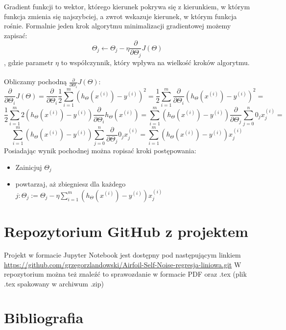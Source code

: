 \documentclass{article}
\begin{document}
Gradient funkcji to wektor, którego kierunek pokrywa się z kierunkiem, w którym funkcja zmienia się najszybciej, a zwrot wskazuje kierunek, w którym funkcja rośnie. Formalnie jeden krok algorytmu minimalizacji gradientowej możemy zapisać:
\[\Theta_j \leftarrow\Theta_j - \eta\frac{\partial}{\partial\Theta_j}J(\Theta)\]
, gdzie parametr $\eta$ to współczynnik, który wpływa na wielkość kroków algorytmu.
\\
\\
Obliczamy pochodną $\frac{\partial}{\partial\Theta_i}J(\Theta)$:
\[\frac{\partial}{\partial\Theta_i}J(\Theta) = \frac{\partial}{\partial\Theta_i}\frac{1}{2}\sum_{i=1}^m{(h_\Theta(x^{(i)}) - y^{(i)})}^2 =
\frac{1}{2}\sum_{i=1}^m\frac{\partial}{\partial\Theta_i} {(h_\Theta(x^{(i)}) - y^{(i)})}^2 =
\]
\[
\frac{1}{2}\sum_{i=1}^m2(h_\Theta(x^{(i)}) - y^{(i)})\frac{\partial}{\partial\Theta_i}h_\Theta(x^{(i)}) =
\sum_{i=1}^m(h_\Theta(x^{(i)}) - y^{(i)})\frac{\partial}{\partial\Theta_j}\sum_{j=0}^n 0_j x_j^{(i)} =
\]
\[
\sum_{i=1}^m(h_\Theta(x^{(i)}) - y^{(i)})\sum_{j=0}^n\frac{\partial}{\partial\Theta_j} 0_j x_j^{(i)} =
\sum_{i=1}^m(h_\Theta(x^{(i)}) - y^{(i)})x^{(i)}_j
\]
\newpage
Posiadając wynik pochodnej można ropisać kroki postępowania:
\begin{itemize}
  \item Zainicjuj $\Theta_j$
  \item powtarzaj, aż zbiegniesz dla każdego $j:\Theta_j:= \Theta_j - \eta \sum_{i=1}^m(h_\Theta(x^{(i)}) - y^{(i)})x^{(i)}_j$
\end{itemize}

\section{Repozytorium GitHub z projektem}
Projekt w formacie Jupyter Notebook jest dostępny pod następującym linkiem \url{https://github.com/grzegorzlandowski/Airfoil-Self-Noise-regresja-liniowa.git} \newline
W repozytorium można też znaleźć to sprawozdanie w formacie PDF oraz .tex (plik .tex spakowany w archiwum .zip)




\pagebreak

\section{Bibliografia}
\newcommand{\makeboxlabel}[1]{\fbox{#1.}\hfill}%
\newenvironment{boxlabel}
  {\begin{list}
    {\arabic{boxlblcounter}}
    {\usecounter{boxlblcounter}
     \setlength{\labelwidth}{3em}
     \setlength{\labelsep}{0em}
     \setlength{\itemsep}{2pt}
     \setlength{\leftmargin}{1.5cm}
     \setlength{\rightmargin}{2cm}
     \setlength{\itemindent}{0em} 
     \let\makelabel=\makeboxlabel
    }
  }
{\end{list}}
\end{document}
